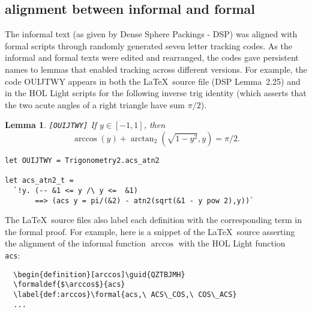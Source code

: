 \documentclass{amsart}
\newtheorem{lemma}[theorem]{Lemma}
\begin{document}





\subsection{alignment between informal and formal}

The informal text (as given by Dense Sphere Packings - DSP) was
aligned with formal scripts through randomly generated seven letter
tracking codes.  As the informal and formal texts were edited and
rearranged, the codes gave persistent names to lemmas that enabled
tracking across different versions.  For example, the code OUIJTWY
appears in both the \LaTeX\ source file (DSP Lemma~2.25) and in the
HOL Light scripts for the following inverse trig identity (which
asserts that the two acute angles of a right triangle have sum
$\pi/2$).

\begin{lemma}{\tt [OUIJTWY]} If $y\in [-1,1]$, then
\[
\arccos(y) + \arctan_2\left(\sqrt{1-y^2},y\right) = \pi/2.
\]
\end{lemma}

\begin{verbatim}
let OUIJTWY = Trigonometry2.acs_atn2

let acs_atn2_t = 
  `!y. (-- &1 <= y /\ y <=  &1) 
       ==> (acs y = pi/(&2) - atn2(sqrt(&1 - y pow 2),y))`
\end{verbatim}

The \LaTeX\ source files also label each definition with the
corresponding term in the formal proof. For example, here is a snippet
of the \LaTeX\ source asserting the alignment
of the informal function $\arccos$ with the HOL Light function {\tt
  acs}:

\begin{verbatim}
  \begin{definition}[arccos]\guid{QZTBJMH}
  \formaldef{$\arccos$}{acs}
  \label{def:arccos}\formal{acs,\ ACS\_COS,\ COS\_ACS}
  ...
\end{verbatim}
\end{document}
